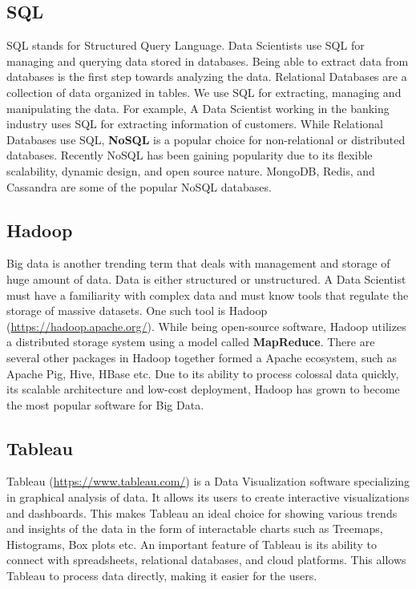 \documentclass[
]{book}
\begin{document}
\hypertarget{sql}{%
\subsection*{SQL}\label{sql}}


SQL stands for Structured Query Language. Data Scientists use SQL for managing and querying data stored in databases. Being able to extract data from databases is the first step towards analyzing the data. Relational Databases are a collection of data organized in tables. We use SQL for extracting, managing and manipulating the data. For example, A Data Scientist working in the banking industry uses SQL for extracting information of customers. While Relational Databases use SQL, \textbf{NoSQL} is a popular choice for non-relational or distributed databases. Recently NoSQL has been gaining popularity due to its flexible scalability, dynamic design, and open source nature. MongoDB, Redis, and Cassandra are some of the popular NoSQL databases.

\hypertarget{hadoop}{%
\subsection*{Hadoop}\label{hadoop}}


Big data is another trending term that deals with management and storage of huge amount of data. Data is either structured or unstructured. A Data Scientist must have a familiarity with complex data and must know tools that regulate the storage of massive datasets. One such tool is Hadoop (\url{https://hadoop.apache.org/}). While being open-source software, Hadoop utilizes a distributed storage system using a model called \textbf{MapReduce}. There are several other packages in Hadoop together formed a Apache ecosystem, such as Apache Pig, Hive, HBase etc. Due to its ability to process colossal data quickly, its scalable architecture and low-cost deployment, Hadoop has grown to become the most popular software for Big Data.

\hypertarget{tableau}{%
\subsection*{Tableau}\label{tableau}}


Tableau (\url{https://www.tableau.com/}) is a Data Visualization software specializing in graphical analysis of data. It allows its users to create interactive visualizations and dashboards. This makes Tableau an ideal choice for showing various trends and insights of the data in the form of interactable charts such as Treemaps, Histograms, Box plots etc. An important feature of Tableau is its ability to connect with spreadsheets, relational databases, and cloud platforms. This allows Tableau to process data directly, making it easier for the users.
\end{document}
